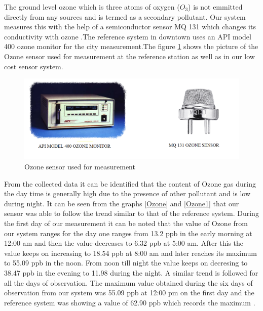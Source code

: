   The ground level ozone which is three atoms of oxygen ($O_3$) is not emmitted directly from any sources and is termed as a secondary pollutant. Our system measures this with the help of a semiconductor sensor MQ 131 which changes its conductivity with ozone \cite{technicalsheetozone}.The reference system in downtown uses an API model 400 ozone monitor for the city measurement\cite{Environment2010}.The figure \ref{Ozonesensor} shows the picture of the Ozone sensor used for measurement at the reference station as well as in our low cost sensor system.
  \begin{figure}[h]
    \begin{center}
    \includegraphics[scale=0.70]{images/figure30.png}
    \end{center}
    \caption{Ozone sensor used for measurement}
    \label{Ozonesensor}
  \end{figure}
  \bigskip

  
  From the collected data it can be identified that the content of Ozone gas during the day time is generally high due to the presence of other pollutant and is low during night. It can be seen from the graphs \ref{Ozone} and \ref{Ozone1} that our sensor was able to follow the trend similar to that of the reference system. During the first day of our measurement it can be noted that the value of Ozone from our system ranges for the day one ranges from 13.2 ppb in the early morning at 12:00 am and then the value decreases to  6.32 ppb at 5:00 am. After this the value keeps on increasing to 18.54 ppb at 8:00 am and later reaches its maximum to 55.09 ppb in the noon. From noon till night the value keeps on decresing to 38.47 ppb in the evening to 11.98 during the night. A similar trend is followed for all the days of observation. The maximum value obtained during the six days of observation from our system was 55.09 ppb at 12:00 pm on the first day and the reference system was showing a value of 62.90 ppb which records the maximum .

